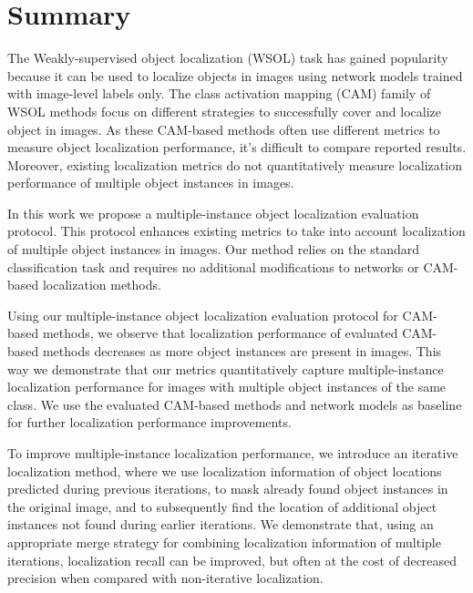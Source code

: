 \chapter*{Summary}

The Weakly-supervised object localization (WSOL) task has gained popularity because it can be used to localize objects in images using network models trained with image-level labels only. The class activation mapping (CAM) family of WSOL methods focus on different strategies to successfully cover and localize object in images. As these CAM-based methods often use different metrics to measure object localization performance, it's difficult to compare reported results. Moreover, existing localization metrics do not quantitatively measure localization performance of multiple object instances in images.

In this work we propose a multiple-instance object localization evaluation protocol. This protocol enhances existing metrics to take into account localization of multiple object instances in images. Our method relies on the standard classification task and requires no additional modifications to networks or CAM-based localization methods.

Using our multiple-instance object localization evaluation protocol for CAM-based methods, we observe that localization performance of evaluated CAM-based methods decreases as more object instances are present in images. This way we demonstrate that our metrics quantitatively capture multiple-instance localization performance for images with multiple object instances of the same class. We use the evaluated CAM-based methods and network models as baseline for further localization performance improvements.

To improve multiple-instance localization performance, we introduce an iterative localization method, where we use localization information of object locations predicted during previous iterations, to mask already found object instances in the original image, and to subsequently find the location of additional object instances not found during earlier iterations. We demonstrate that, using an appropriate merge strategy for combining localization information of multiple iterations, localization recall can be improved, but often at the cost of decreased precision when compared with non-iterative localization.